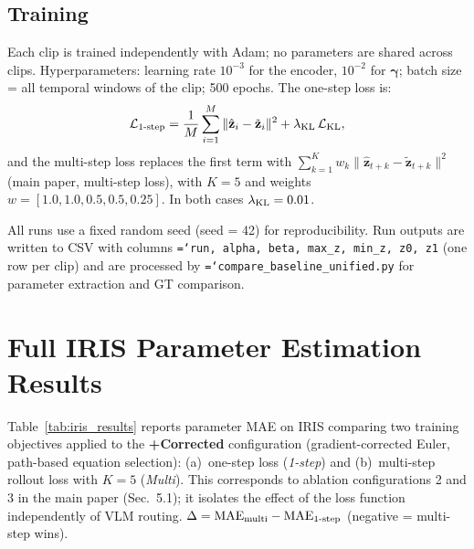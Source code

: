 \documentclass[runningheads]{llncs}
\newcommand{\ttt}[1]{\texttt{\hyphenchar\font=`\-\relax #1}}
\begin{document}
\subsection{Training}
\label{app:training}

Each clip is trained independently with Adam; no parameters are shared
across clips. Hyperparameters: learning rate $10^{-3}$ for the encoder,
$10^{-2}$ for $\boldsymbol{\gamma}$; batch size = all temporal windows of
the clip; 500 epochs. The one-step loss is:
%
\[
  \mathcal{L}_{\rm 1\text{-}step}
    = \frac{1}{M}\sum_{i=1}^{M}\|\hat{\mathbf{z}}_i - \tilde{\mathbf{z}}_i\|^2
    + \lambda_{\rm KL}\,\mathcal{L}_{\rm KL},
\]
%
and the multi-step loss replaces the first term with
$\sum_{k=1}^{K} w_k \|\hat{\mathbf{z}}_{t+k} - \tilde{\mathbf{z}}_{t+k}\|^2$
(main paper, multi-step loss), with $K = 5$ and weights
$w = [1.0, 1.0, 0.5, 0.5, 0.25]$.
In both cases $\lambda_{\rm KL} = 0.01$.

All runs use a fixed random seed (seed = 42) for reproducibility.
Run outputs are written to CSV with columns
\ttt{run, alpha, beta, max\_z, min\_z, z0, z1} (one row per clip) and
are processed by \ttt{compare\_baseline\_unified.py} for parameter
extraction and GT comparison.


\section{Full IRIS Parameter Estimation Results}
\label{app:iris_full_results}

Table~\ref{tab:iris_results} reports parameter MAE on IRIS comparing two
training objectives applied to the \textbf{+Corrected} configuration
(gradient-corrected Euler, path-based equation selection):
(a)~one-step loss (\emph{1-step}) and
(b)~multi-step rollout loss with $K{=}5$ (\emph{Multi}).
This corresponds to ablation configurations 2 and 3 in the main paper
(Sec.~5.1); it isolates the effect of the loss function independently
of VLM routing.
$\Delta = \mathrm{MAE}_{\rm multi} - \mathrm{MAE}_{\rm 1\text{-}step}$
(negative = multi-step wins).
\end{document}
